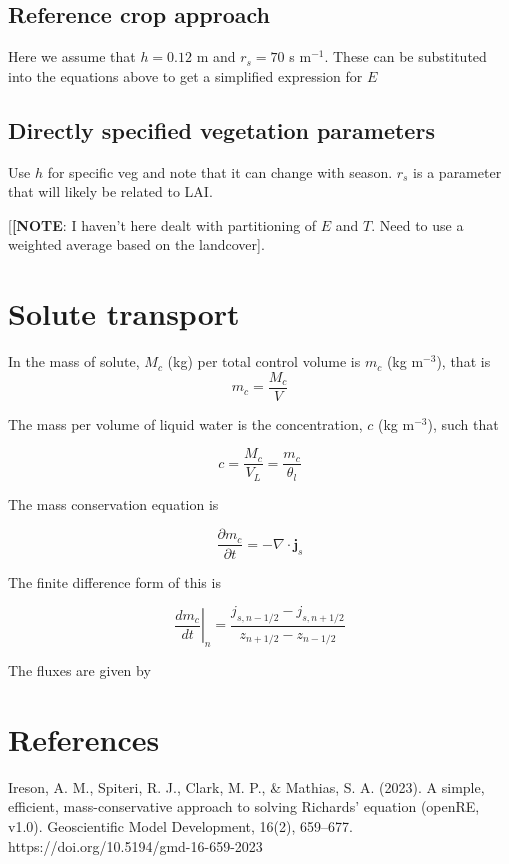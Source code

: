 \documentclass[10pt,a4paper]{article}
\begin{document}
\subsection{Reference crop approach}

Here we assume that $h=0.12$ m and $r_s = 70$ s m$^{-1}$. These can be substituted into the equations above to get a simplified expression for $E$

\subsection{Directly specified vegetation parameters}
Use $h$ for specific veg and note that it can change with season. $r_s$ is a parameter that will likely be related to LAI.

[{\bf [NOTE}: I haven't here dealt with partitioning of $E$ and $T$. Need to use a weighted average based on the landcover].

\section{Solute transport}

In the mass of solute, $M_c$ (kg) per total control volume is $m_c$ (kg m$^{-3}$), that is
\begin{equation}
m_c=\frac{M_c}{V}
\end{equation}

The mass per volume of liquid water is the concentration, $c$  (kg m$^{-3}$), such that

\begin{equation}
c=\frac{M_c}{V_L}=\frac{m_c}{\theta_l}
\end{equation}

The mass conservation equation is

\begin{equation}
\frac{\partial m_c}{\partial t}=-\nabla\cdot\mathbf{j}_s
\end{equation}

The finite difference form of this is 

\begin{equation}
\left . \frac{d m_c}{d t}\right |_n=
\frac{j_{s,n-1/2}-j_{s,n+1/2}}{z_{n+1/2}-z_{n-1/2}}
\end{equation}

The fluxes are given by




\section{References}

Ireson, A. M., Spiteri, R. J., Clark, M. P., \& Mathias, S. A. (2023). A simple, efficient, mass-conservative approach to solving Richards’ equation (openRE, v1.0). Geoscientific Model Development, 16(2), 659–677. https://doi.org/10.5194/gmd-16-659-2023
\end{document}
